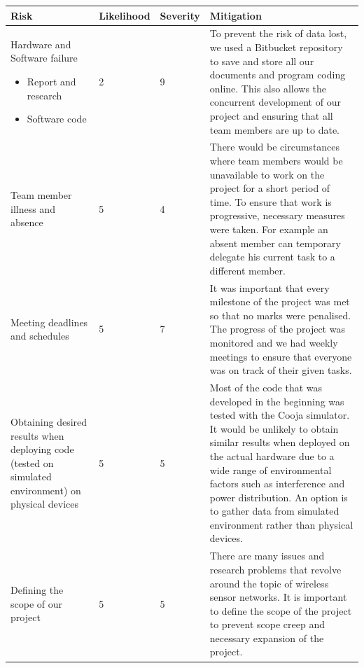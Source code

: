 \begin{center}
	\begin{longtable}{| p{4cm} | l | l | p{7cm} |}
	\hline
	Risk & Likelihood & Severity & Mitigation\\
	\hline	
	
	Hardware and Software failure
	\begin{itemize}
		\item Report and research
		\item Software code
	\end{itemize}
	 & 2 & 9 & To prevent the risk of data lost, we used a Bitbucket repository to save and store all our documents and program coding online. This also allows the concurrent development of our project and ensuring that all team members are up to date.
	 
	\\ \hline
	
	Team member illness and absence
	& 5 & 4 & There would be circumstances where team members would be unavailable to work on the project for a short period of time. To ensure that work is progressive, necessary measures were taken. For example an absent member can temporary delegate his current task to a different member.
	
	\\ \hline
		
	Meeting deadlines and schedules
	& 5 & 7 & It was important that every milestone of the project was met so that no marks were penalised. The progress of the project was monitored and we had weekly meetings to ensure that everyone was on track of their given tasks.
	
	\\ \hline
	
	Obtaining desired results when deploying code (tested on simulated environment) on physical devices
	& 5 & 5 & Most of the code that was developed in the beginning was tested with the Cooja simulator. It would be unlikely to obtain similar results when deployed on the actual hardware due to a wide range of environmental factors such as interference and power distribution. An option is to gather data from simulated environment rather than physical devices.
	
		\\ \hline
		
	Defining the scope of our project
	& 5 & 5 & There are many issues and research problems that revolve around the topic of wireless sensor networks. It is important to define the scope of the project to prevent scope creep and necessary expansion of the project.


\end{longtable}
\end{center}

